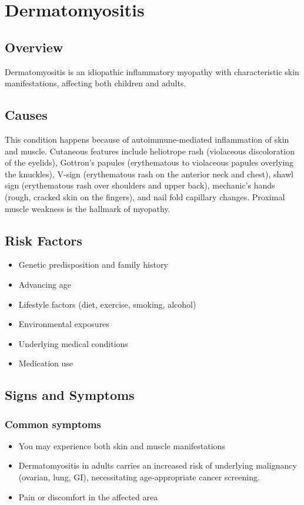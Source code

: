 \chapter{Dermatomyositis}
\label{sec:skin:Dermatomyositis}

\section{Overview}
Dermatomyositis is an idiopathic inflammatory myopathy with characteristic skin manifestations, affecting both children and adults.
\section{Causes}
This condition happens because of autoimmune-mediated inflammation of skin and muscle. Cutaneous features include heliotrope rash (violaceous discoloration of the eyelids), Gottron's papules (erythematous to violaceous papules overlying the knuckles), V-sign (erythematous rash on the anterior neck and chest), shawl sign (erythematous rash over shoulders and upper back), mechanic's hands (rough, cracked skin on the fingers), and nail fold capillary changes. Proximal muscle weakness is the hallmark of myopathy.     
\section{Risk Factors}

\begin{itemize}[noitemsep]
  \item Genetic predisposition and family history
  \item Advancing age
  \item Lifestyle factors (diet, exercise, smoking, alcohol)
  \item Environmental exposures
  \item Underlying medical conditions
  \item Medication use
\end{itemize}
\section{Signs and Symptoms}

\subsection{Common symptoms}
\begin{itemize}[noitemsep]
  \item You may experience both skin and muscle manifestations
  \item Dermatomyositis in adults carries an increased risk of underlying malignancy (ovarian, lung, GI), necessitating age-appropriate cancer screening.
  \item Pain or discomfort in the affected area
  \end{itemize}

